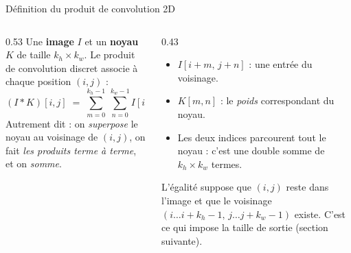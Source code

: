 \begin{frame}{Définition du produit de convolution 2D}
\begin{columns}[t]
\begin{column}{0.53\textwidth}
Une \textbf{image} $I$ et un \textbf{noyau} $K$ de taille $k_h \times k_w$. Le produit de
convolution discret associe à chaque position $(i,j)$ :
\[
(I \ast K)[i,j] \;=\; \sum_{m=0}^{k_h-1}\ \sum_{n=0}^{k_w-1}
I[i+m,\, j+n]\, K[m,n].
\]
Autrement dit : on \emph{superpose} le noyau au voisinage de $(i,j)$, on fait
\emph{les produits terme à terme}, et on \emph{somme}.
\end{column}
\begin{column}{0.43\textwidth}
\begin{kbox}
\begin{itemize}
  \item $I[i+m,\,j+n]$ : une entrée du voisinage.
  \item $K[m,n]$ : le \emph{poids} correspondant du noyau.
  \item Les deux indices parcourent tout le noyau : c'est une double somme de
  $k_h \times k_w$ termes.
\end{itemize}
\end{kbox}
\begin{wbox}[Indices]
L'égalité suppose que $(i,j)$ reste dans l'image et que le voisinage
$(i \dots i+k_h-1,\, j \dots j+k_w-1)$ existe. C'est ce qui impose la taille de sortie
(section suivante).
\end{wbox}
\end{column}
\end{columns}
\end{frame}

